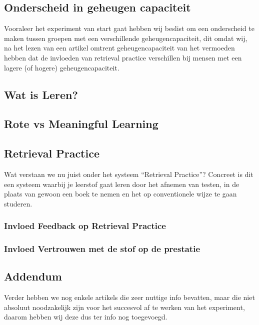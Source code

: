 \documentclass[12pt,a4paper]{article}
\begin{document}
        \subsection{Onderscheid in geheugen capaciteit}
        \label{geheugencapaciteit}
        Vooraleer het experiment van start gaat hebben wij beslist om een onderscheid te maken tussen groepen met een verschillende geheugencapaciteit, dit omdat wij, na het lezen van een artikel omtrent geheugencapaciteit van \cite{Agarwal2016} het vermoeden hebben dat de invloeden van retrieval practice verschillen bij mensen met een lagere (of hogere) geheugencapaciteit.
                
        \subsection{Wat is Leren?}
        
        \subsection{Rote vs Meaningful Learning}
        \label{RoteVSMeaningful}
        
        \subsection{Retrieval Practice}
        
        Wat verstaan we nu juist onder het systeem ``Retrieval Practice''? Concreet is dit een systeem waarbij je leerstof gaat leren door het afnemen van testen, in de plaats van gewoon een boek te nemen en het op conventionele wijze te gaan studeren.
        
            \subsubsection{Invloed Feedback op Retrieval Practice}
    
            \subsubsection{Invloed Vertrouwen met de stof op de prestatie}
            
        \subsection{Addendum}
        
        Verder hebben we nog enkele artikels die zeer nuttige info bevatten, maar die niet absoluut noodzakelijk zijn voor het succesvol af te werken van het experiment, daarom hebben wij deze dus ter info nog toegevoegd.
        
\end{document}
